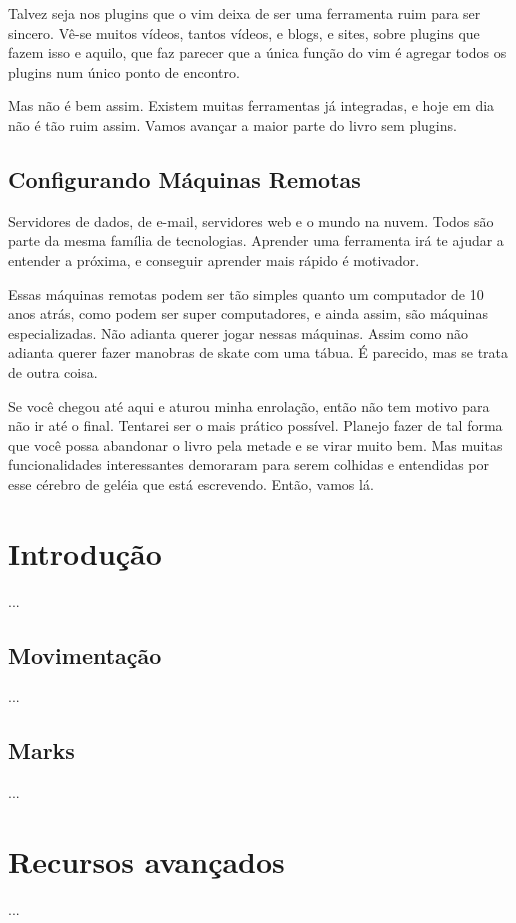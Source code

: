 \documentclass[a4paper, 12pt]{article}
\begin{document}
Talvez seja nos plugins que o vim deixa de ser uma ferramenta ruim para ser sincero.
Vê-se muitos vídeos, tantos vídeos, e blogs, e sites, sobre plugins que fazem isso e aquilo, que faz parecer que a única função do vim é agregar todos os plugins num único ponto de encontro.

Mas não é bem assim. Existem muitas ferramentas já integradas, e hoje em dia não é tão ruim assim.
Vamos avançar a maior parte do livro sem plugins.

\subsection{Configurando Máquinas Remotas}
Servidores de dados, de e-mail, servidores web e o mundo na nuvem.
Todos são parte da mesma família de tecnologias.
Aprender uma ferramenta irá te ajudar a entender a próxima, e conseguir aprender mais rápido é motivador.

Essas máquinas remotas podem ser tão simples quanto um computador de 10 anos atrás, como podem ser super computadores, e ainda assim, são máquinas especializadas.
Não adianta querer jogar nessas máquinas.
Assim como não adianta querer fazer manobras de skate com uma tábua.
É parecido, mas se trata de outra coisa.

Se você chegou até aqui e aturou minha enrolação, então não tem motivo para não ir até o final.
Tentarei ser o mais prático possível.
Planejo fazer de tal forma que você possa abandonar o livro pela metade e se virar muito bem.
Mas muitas funcionalidades interessantes demoraram para serem colhidas e entendidas por esse cérebro de geléia que está escrevendo. Então, vamos lá.

\newpage

\section{Introdução}
...
\newpage

\subsection{Movimentação}
...
\newpage

\subsection{Marks}
...
\newpage

\section{Recursos avançados}
...
\newpage
\end{document}

